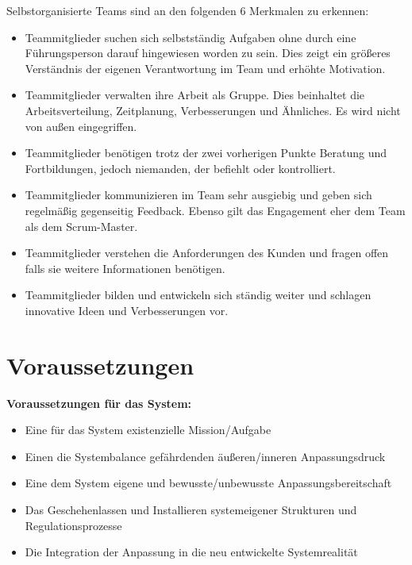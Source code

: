 Selbstorganisierte Teams sind an den folgenden 6 Merkmalen zu erkennen:\cite{Mittal2013}
\begin{itemize}
    \item Teammitglieder suchen sich selbstständig Aufgaben ohne durch eine Führungsperson darauf hingewiesen worden zu sein. Dies zeigt ein größeres Verständnis der eigenen Verantwortung im Team und erhöhte Motivation.
    \item Teammitglieder verwalten ihre Arbeit als Gruppe. Dies beinhaltet die Arbeitsverteilung, Zeitplanung, Verbesserungen und Ähnliches. Es wird nicht von außen eingegriffen.
    \item Teammitglieder benötigen trotz der zwei vorherigen Punkte Beratung und Fortbildungen, jedoch niemanden, der befiehlt oder kontrolliert.
	\item Teammitglieder kommunizieren im Team sehr ausgiebig und geben sich regelmäßig gegenseitig Feedback. Ebenso gilt das Engagement eher dem Team als dem Scrum-Master.
	\item Teammitglieder verstehen die Anforderungen des Kunden und fragen offen falls sie weitere Informationen benötigen.
    \item Teammitglieder bilden und entwickeln sich ständig weiter und schlagen innovative Ideen und Verbesserungen vor.
\end{itemize}


\section{Voraussetzungen}

\textbf{Voraussetzungen für das System:}\cite{Gloger2014}
\begin{itemize}
	\item Eine für das System existenzielle Mission/Aufgabe
	\item Einen die Systembalance gefährdenden äußeren/inneren Anpassungsdruck
	\item Eine dem System eigene und bewusste/unbewusste Anpassungsbereitschaft
	\item Das Geschehenlassen und Installieren systemeigener Strukturen und Regulationsprozesse
	\item Die Integration der Anpassung in die neu entwickelte Systemrealität
\end{itemize}

